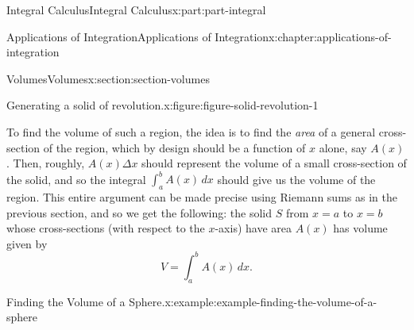 \documentclass[twoside,10pt,]{tufte-book}
\numberwithin{equation}{part}
\begin{document}
\begin{partptx}{Integral Calculus}{}{Integral Calculus}{}{}{x:part:part-integral}
\begin{chapterptx}{Applications of Integration}{}{Applications of Integration}{}{}{x:chapter:applications-of-integration}
\begin{sectionptx}{Volumes}{}{Volumes}{}{}{x:section:section-volumes}
\begin{figureptx}{Generating a solid of revolution.}{x:figure:figure-solid-revolution-1}{}
\begin{sidebyside}{2}{0}{0}{0}
\begin{sbspanel}{0.5}
{
}%
\end{sbspanel}%
\begin{sbspanel}{0.5}%
%
\end{sbspanel}%
\end{sidebyside}%
\tcblower
\end{figureptx}%
To find the volume of such a region, the idea is to find the \emph{area} of a general cross-section of the region, which by design should be a function of \(x\) alone, say \(A(x)\). Then, roughly, \(A(x)\Delta x\) should represent the volume of a small cross-section of the solid, and so the integral \(\int_{a}^{b}A(x)\,dx\) should give us the volume of the region. This entire argument can be made precise using Riemann sums as in the previous section, and so we get the following: the solid \(S\) from \(x = a\) to \(x = b\) whose cross-sections (with respect to the \(x\)-axis) have area \(A(x)\) has volume given by%
\begin{equation}
V = \int_{a}^{b}A(x)\,dx.\label{x:men:equation-solid-revolution-volume}
\end{equation}
%
\begin{example}{Finding the Volume of a Sphere.}{x:example:example-finding-the-volume-of-a-sphere}%

\end{example}
\end{sectionptx}
\end{chapterptx}
\end{partptx}
\end{document}
